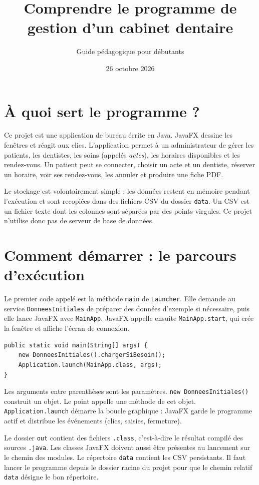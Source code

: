 \documentclass[11pt,a4paper]{report}
\title{Comprendre le programme de gestion d'un cabinet dentaire}
\author{Guide pédagogique pour débutants}
\date{26 octobre 2026}
\begin{document}
\maketitle
\tableofcontents
\chapter{À quoi sert le programme ?}
Ce projet est une application de bureau écrite en Java. JavaFX dessine les fenêtres et réagit aux clics. L'application permet à un administrateur de gérer les patients, les dentistes, les soins (appelés \emph{actes}), les horaires disponibles et les rendez-vous. Un patient peut se connecter, choisir un acte et un dentiste, réserver un horaire, voir ses rendez-vous, les annuler et produire une fiche PDF.

Le stockage est volontairement simple : les données restent en mémoire pendant l'exécution et sont recopiées dans des fichiers CSV du dossier \texttt{data}. Un CSV est un fichier texte dont les colonnes sont séparées par des points-virgules. Ce projet n'utilise donc pas de serveur de base de données.

\chapter{Comment démarrer : le parcours d'exécution}
Le premier code appelé est la méthode \texttt{main} de \texttt{Launcher}. Elle demande au service \texttt{DonneesInitiales} de préparer des données d'exemple si nécessaire, puis elle lance JavaFX avec \texttt{MainApp}. JavaFX appelle ensuite \texttt{MainApp.start}, qui crée la fenêtre et affiche l'écran de connexion.

\begin{lstlisting}
public static void main(String[] args) {
    new DonneesInitiales().chargerSiBesoin();
    Application.launch(MainApp.class, args);
}
\end{lstlisting}

Les arguments entre parenthèses sont les paramètres. \texttt{new DonneesInitiales()} construit un objet. Le point appelle une méthode de cet objet. \texttt{Application.launch} démarre la boucle graphique : JavaFX garde le programme actif et distribue les événements (clics, saisies, fermeture).

Le dossier \texttt{out} contient des fichiers \texttt{.class}, c'est-à-dire le résultat compilé des sources \texttt{.java}. Les classes JavaFX doivent aussi être présentes au lancement sur le chemin des modules. Le répertoire \texttt{data} contient les CSV persistants. Il faut lancer le programme depuis le dossier racine du projet pour que le chemin relatif \texttt{data} désigne le bon répertoire.
\end{document}
